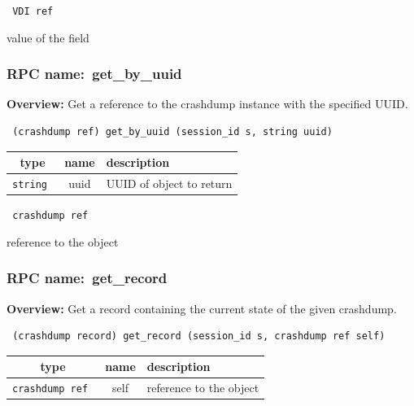 \vspace{0.3cm}

{\tt 
VDI ref
}


value of the field
\vspace{0.3cm}
\vspace{0.3cm}
\vspace{0.3cm}
\subsubsection{RPC name:~get\_by\_uuid}

{\bf Overview:} 
Get a reference to the crashdump instance with the specified UUID.

\begin{verbatim} (crashdump ref) get_by_uuid (session_id s, string uuid)\end{verbatim}



 
\vspace{0.3cm}
\begin{tabular}{|c|c|p{7cm}|}
 \hline
{\bf type} & {\bf name} & {\bf description} \\ \hline
{\tt string } & uuid & UUID of object to return \\ \hline 

\end{tabular}

\vspace{0.3cm}

{\tt 
crashdump ref
}


reference to the object
\vspace{0.3cm}
\vspace{0.3cm}
\vspace{0.3cm}
\subsubsection{RPC name:~get\_record}

{\bf Overview:} 
Get a record containing the current state of the given crashdump.

\begin{verbatim} (crashdump record) get_record (session_id s, crashdump ref self)\end{verbatim}



 
\vspace{0.3cm}
\begin{tabular}{|c|c|p{7cm}|}
 \hline
{\bf type} & {\bf name} & {\bf description} \\ \hline
{\tt crashdump ref } & self & reference to the object \\ \hline 

\end{tabular}


